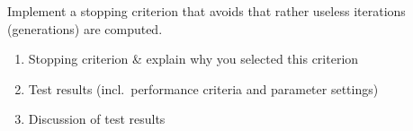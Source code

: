 
Implement a stopping criterion that avoids that rather useless iterations (generations) are computed.
\begin{enumerate}
\item	 Stopping criterion \& explain why you selected this criterion
\item Test results (incl.\ performance criteria and parameter settings)
\item Discussion of test results

\end{enumerate}


